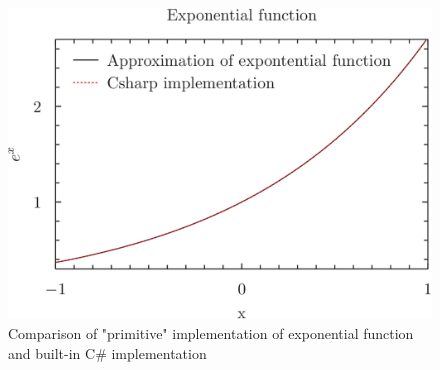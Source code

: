\documentclass{article}
\begin{document}
\begin{figure}
    \centering
    \includegraphics{plot.png}
    \caption{Comparison of "primitive" implementation of exponential function and built-in C\# implementation}
    \label{fig:my_label}
\end{figure}
\end{document}
